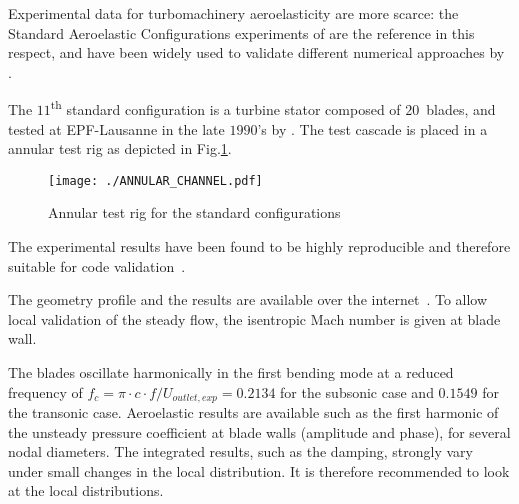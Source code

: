 
Experimental data for turbomachinery aeroelasticity are more scarce: 
the Standard Aeroelastic Configurations experiments 
of \citet{Fransson:1999uq} are the 
reference in this respect, and have been widely used 
to validate different numerical approaches by \citet{Sbardella:2001fk,
Duta:2002uq,Campobasso:2003fk,Cinnella2004,mcbean2005}. 

The $11$\textsuperscript{th} standard configuration is a
turbine stator composed of $20$~blades, and tested at EPF-Lausanne
in the late $1990$'s by \citet{Fransson:1999uq}.
The test cascade is placed in a 
annular test rig as depicted in Fig.\ref{fig:annular_channel}.
\begin{figure}[htbp]
  \centering
  \texttt{[image: ./ANNULAR\_CHANNEL.pdf]}
  \caption{Annular test rig for the standard configurations}
  \label{fig:annular_channel}
\end{figure}
The experimental results have been found to be highly reproducible and
therefore suitable for code validation~\cite{Fransson:1999uq}.  

The geometry profile and the results are available over the
internet~\cite{stcf11web}.  To allow local validation of the steady
flow, the isentropic Mach number is given at blade wall.

The blades oscillate harmonically in the first bending mode
at a reduced frequency of $f_{c} =\pi \cdot c \cdot
f/U_{outlet, exp} = 0.2134$ for the subsonic case and $0.1549$ for the
transonic case. Aeroelastic
results are available such as the first harmonic of the unsteady pressure
coefficient at blade walls (amplitude and phase), for several nodal
diameters. The integrated
results, such as the damping, strongly vary under small changes in the
local distribution. It is therefore recommended to look at the local
distributions.